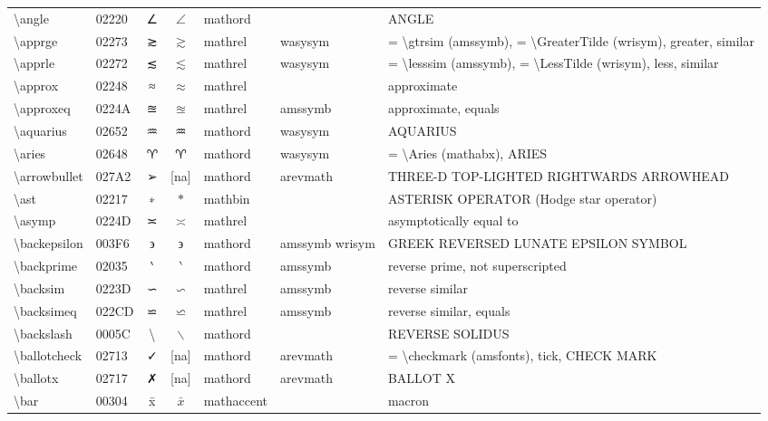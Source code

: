 \documentclass[a4paper,landscape]{article}
\begin{document}
\begin{longtable}{llcclll}
\textbackslash{}angle & 02220 & ∠ & $\angle$ & mathord &  & ANGLE \\
\textbackslash{}apprge & 02273 & ≳ & $\apprge$ & mathrel & wasysym & = \textbackslash{}gtrsim (amssymb),  = \textbackslash{}GreaterTilde (wrisym),  greater,  similar \\
\textbackslash{}apprle & 02272 & ≲ & $\apprle$ & mathrel & wasysym & = \textbackslash{}lesssim (amssymb),  = \textbackslash{}LessTilde (wrisym),  less,  similar \\
\textbackslash{}approx & 02248 & ≈ & $\approx$ & mathrel &  & approximate \\
\textbackslash{}approxeq & 0224A & ≊ & $\approxeq$ & mathrel & amssymb & approximate, equals \\
\textbackslash{}aquarius & 02652 & \textsf ♒ & $\aquarius$ & mathord & wasysym & AQUARIUS \\
\textbackslash{}aries & 02648 & \textsf ♈ & $\aries$ & mathord & wasysym & = \textbackslash{}Aries (mathabx), ARIES \\
\textbackslash{}arrowbullet & 027A2 & ➢ & [na] & mathord & arevmath & THREE-D TOP-LIGHTED RIGHTWARDS ARROWHEAD \\
\textbackslash{}ast & 02217 & ∗ & $\ast$ & mathbin &  & ASTERISK OPERATOR (Hodge star operator) \\
\textbackslash{}asymp & 0224D & ≍ & $\asymp$ & mathrel &  & asymptotically equal to \\
\textbackslash{}backepsilon & 003F6 & ϶ & $\backepsilon$ & mathord & amssymb wrisym & GREEK REVERSED LUNATE EPSILON SYMBOL \\
\textbackslash{}backprime & 02035 & ‵ & $\backprime$ & mathord & amssymb & reverse prime, not superscripted \\
\textbackslash{}backsim & 0223D & ∽ & $\backsim$ & mathrel & amssymb & reverse similar \\
\textbackslash{}backsimeq & 022CD & ⋍ & $\backsimeq$ & mathrel & amssymb & reverse similar, equals \\
\textbackslash{}backslash & 0005C & \textbackslash{} & $\backslash$ & mathord &  & REVERSE SOLIDUS \\
\textbackslash{}ballotcheck & 02713 & ✓ & [na] & mathord & arevmath & = \textbackslash{}checkmark (amsfonts),  tick,  CHECK MARK \\
\textbackslash{}ballotx & 02717 & ✗ & [na] & mathord & arevmath & BALLOT X \\
\textbackslash{}bar & 00304 & x̄ & $\bar{x}$ & mathaccent &  & macron \\

\end{longtable}
\end{document}

